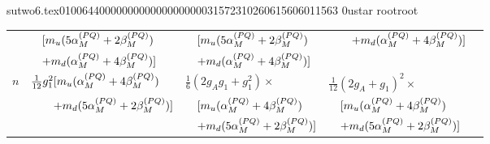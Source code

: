                                                                                                                                                                                                                                                                                       sutwo6.tex                                                                                          0100644 0000000 0000000 00000315723 10260615606 011563  0                                                                                                    ustar   root                            root                                                                                                                                                                                                                   \documentclass[prd,amssymb,amsmath,showpacs,nofootinbib,superscriptaddress]{revtex4}
\begin{document}
\begin{table}[ht]
\begin{tabular}{l | l l l l  }
& $\quad [ m_u (5{\alpha}_M^{(PQ)} +2{\beta}_M^{(PQ)})$ 
& $\quad [ m_u (5{\alpha}_M^{(PQ)} +2{\beta}_M^{(PQ)})$
& $\qquad + m_d ({\alpha}_M^{(PQ)} +4{\beta}_M^{(PQ)})]$
&  \\

& $\quad +m_d ({\alpha}_M^{(PQ)} +4{\beta}_M^{(PQ)})]$
& $\quad +m_d ({\alpha}_M^{(PQ)} +4{\beta}_M^{(PQ)})]$
&
& \\

\hline
$n$  
&  $\frac{1}{12} g_1^2[ m_u ({\alpha}_M^{(PQ)} +4{\beta}_M^{(PQ)})$   
&  $\frac{1}{6} (2 g_A g_1 +g_1^2) \times $  
&  $\frac{1}{12}(2g_A +g_1)^2 \times $ & \\

& $\qquad +m_d (5{\alpha}_M^{(PQ)} +2{\beta}_M^{(PQ)})]$ 
& $\quad [ m_u ({\alpha}_M^{(PQ)} +4{\beta}_M^{(PQ)})$
& $\quad [ m_u ({\alpha}_M^{(PQ)} +4{\beta}_M^{(PQ)})$
& \\

&
& $\quad +m_d(5{\alpha}_M^{(PQ)} +2{\beta}_M^{(PQ)}) ]$ 
& $\quad +m_d (5{\alpha}_M^{(PQ)} +2{\beta}_M^{(PQ)})]$
& \\
\end{tabular}
\label{t:NPQQCD-F}
\end{table}
\endgroup
\end{document}
